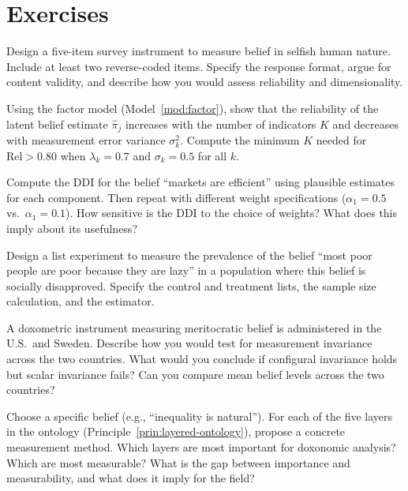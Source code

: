 \section{Exercises}

\begin{exercise}
Design a five-item survey instrument to measure belief in selfish human nature.
Include at least two reverse-coded items.
Specify the response format, argue for content validity, and describe how you would assess reliability and dimensionality.
\end{exercise}

\begin{exercise}
Using the factor model (Model~\ref{mod:factor}), show that the reliability of the latent belief estimate $\hat{\pi}_j$ increases with the number of indicators $K$ and decreases with measurement error variance $\sigma_k^2$.
Compute the minimum $K$ needed for $\text{Rel} > 0.80$ when $\lambda_k = 0.7$ and $\sigma_k = 0.5$ for all $k$.
\end{exercise}

\begin{exercise}
Compute the DDI for the belief ``markets are efficient'' using plausible estimates for each component.
Then repeat with different weight specifications ($\alpha_1 = 0.5$ vs.\ $\alpha_1 = 0.1$).
How sensitive is the DDI to the choice of weights?
What does this imply about its usefulness?
\end{exercise}

\begin{exercise}
\label{ex:ch13-list}
Design a list experiment to measure the prevalence of the belief ``most poor people are poor because they are lazy'' in a population where this belief is socially disapproved.
Specify the control and treatment lists, the sample size calculation, and the estimator.
\end{exercise}

\begin{exercise}
\label{ex:ch13-invariance}
A doxometric instrument measuring meritocratic belief is administered in the U.S.\ and Sweden.
Describe how you would test for measurement invariance across the two countries.
What would you conclude if configural invariance holds but scalar invariance fails?
Can you compare mean belief levels across the two countries?
\end{exercise}

\begin{exercise}
\label{ex:ch13-layers}
Choose a specific belief (e.g., ``inequality is natural'').
For each of the five layers in the ontology (Principle~\ref{prin:layered-ontology}), propose a concrete measurement method.
Which layers are most important for doxonomic analysis?
Which are most measurable?
What is the gap between importance and measurability, and what does it imply for the field?
\end{exercise}

